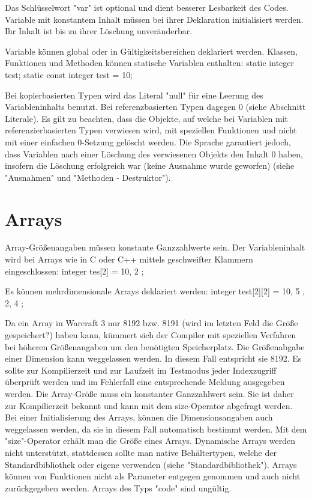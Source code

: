 Das Schlüsselwort "var" ist optional und dient besserer Lesbarkeit des Codes.
Variable mit konstantem Inhalt müssen bei ihrer Deklaration initialisiert werden. Ihr Inhalt ist bis zu ihrer Löschung unveränderbar.

Variable können global oder in Gültigkeitsbereichen deklariert werden.
Klassen, Funktionen und Methoden können statische Variablen enthalten:
static integer test;
static const integer test = 10;

Bei kopierbasierten Typen wird das Literal "null" für eine Leerung des Variableninhalts benutzt. Bei referenzbasierten Typen
dagegen 0 (siehe Abschnitt Literale).
Es gilt zu beachten, dass die Objekte, auf welche bei Variablen mit referenzierbasierten Typen verwiesen wird, mit speziellen Funktionen
und nicht mit einer einfachen 0-Setzung gelöscht werden.
Die Sprache garantiert jedoch, dass Variablen nach einer Löschung des verwiesenen Objekts den Inhalt 0 haben, insofern die Löschung
erfolgreich war (keine Ausnahme wurde geworfen) (siehe "Ausnahmen" und "Methoden - Destruktor").

\section{Arrays}
Array-Größenangaben müssen konstante Ganzzahlwerte sein.
Der Variableninhalt wird bei Arrays wie in C oder C++ mittels geschweifter Klammern eingeschlossen:
integer tes[2] = { 10, 2 };

Es können mehrdimensionale Arrays deklariert werden:
integer test[2][2] = { { 10, 5 }, { 2, 4 } };

Da ein Array in Warcraft 3 nur 8192 bzw. 8191 (wird im letzten Feld die Größe gespeichert?) haben kann, kümmert sich der Compiler
mit speziellen Verfahren bei höheren Größenangaben um den benötigten Speicherplatz.
Die Größenabgabe einer Dimension kann weggelassen werden. In diesem Fall entspricht sie 8192.
Es sollte zur Kompilierzeit und zur Laufzeit im Testmodus jeder Indexzugriff überprüft werden und im Fehlerfall eine entsprechende Meldung
ausgegeben werden.
Die Array-Größe muss ein konstanter Ganzzahlwert sein. Sie ist daher zur Kompilierzeit bekannt und kann mit dem size-Operator abgefragt werden.
Bei einer Initialisierung des Arrays, können die Dimensionsangaben auch weggelassen werden, da sie in diesem Fall automatisch bestimmt werden.
Mit dem "size"-Operator erhält man die Größe eines Arrays.
Dynamische Arrays werden nicht unterstützt, stattdessen sollte man native Behältertypen, welche der Standardbibliothek oder eigene verwenden (siehe "Standardbibliothek").
Arrays können von Funktionen nicht als Parameter entgegen genommen und auch nicht zurückgegeben werden.
Arrays des Typs "code" sind ungültig.
